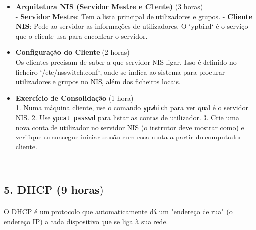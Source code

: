 \documentclass[10pt,a4paper]{article}
\begin{document}
	\begin{itemize}
		\item \textbf{Arquitetura NIS (Servidor Mestre e Cliente)} (3 horas) \\
		- \textbf{Servidor Mestre}: Tem a lista principal de utilizadores e grupos.
		- \textbf{Cliente NIS}: Pede ao servidor as informações de utilizadores. O `ypbind` é o serviço que o cliente usa para encontrar o servidor.
		
		\item \textbf{Configuração do Cliente} (2 horas) \\
		Os clientes precisam de saber a que servidor NIS ligar. Isso é definido no ficheiro `/etc/nsswitch.conf`, onde se indica ao sistema para procurar utilizadores e grupos no NIS, além dos ficheiros locais.
		
		\item \textbf{Exercício de Consolidação} (1 hora) \\
		1. Numa máquina cliente, use o comando \texttt{ypwhich} para ver qual é o servidor NIS.
		2. Use \texttt{ypcat passwd} para listar as contas de utilizador.
		3. Crie uma nova conta de utilizador no servidor NIS (o instrutor deve mostrar como) e verifique se consegue iniciar sessão com essa conta a partir do computador cliente.
	\end{itemize}
	
	---
	
	\subsection*{5. DHCP (9 horas)}
	\vspace{-1.2em}
	\paragraph{}
	O DHCP é um protocolo que automaticamente dá um "endereço de rua" (o endereço IP) a cada dispositivo que se liga à sua rede.
	
\end{document}
